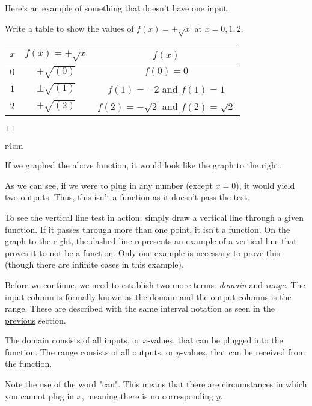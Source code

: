 \documentclass[lang=en,11pt]{elegantbook}
\begin{document}
Here's an example of something that doesn't have one input.
\begin{example}
Write a table to show the values of $f(x)=\pm\sqrt{x}$ at $x=0,1,2$.
\end{example}
\begin{solution}
\begin{center}
\begin{tabular}{ |c|c|c| } 
 \hline
 $x$ & $f(x)=\pm\sqrt{x}$ & $f(x)$ \\ 
 \hline
 $0$ & $\pm\sqrt{(0)}$ & $f(0)=0$ \\ 
 $1$ & $\pm\sqrt{(1)}$ & $f(1)=-2$ and $f(1)=1$ \\
 $2$ & $\pm\sqrt{(2)}$ & $f(2)=-\sqrt{2}$ and $f(2)=\sqrt{2}$ \\
 \hline
\end{tabular}
\end{center}$\Box$
\end{solution}
\begin{wrapfigure}{r}{4cm}
\end{wrapfigure}
If we graphed the above function, it would look like the graph to the right.

As we can see, if we were to plug in any number (except $x=0$), it would yield two outputs.  Thus, this isn't a function as it doesn't pass the test.  

To see the vertical line test in action, simply draw a vertical line through a given function.  If it passes through more than one point, it isn't a function.  On the graph to the right, the dashed line represents an example of a vertical line that proves it to not be a function.  Only one example is necessary to prove this (though there are infinite cases in this example).

Before we continue, we need to establish two more terms: \textit{domain} and \textit{range}.  The input column is formally known as the domain and the output columns is the range.  These are described with the same interval notation as seen in the \hyperlink{section.2.1}{previous} section.
\begin{note}
The domain consists of all inputs, or $x$-values, that can be plugged into the function.  The range consists of all outputs, or $y$-values, that can be received from the function.
\end{note}
Note the use of the word "can".  This means that there are circumstances in which you cannot plug in $x$, meaning there is no corresponding $y$.
\end{document}
